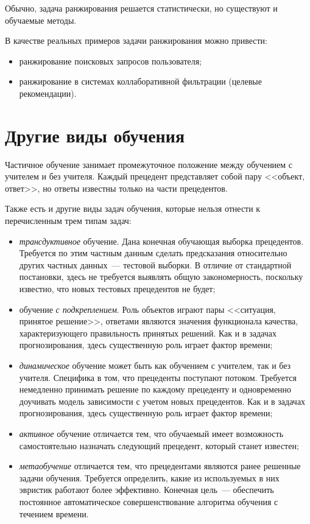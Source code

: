 \begin{itemize}
    Обычно, задача ранжирования решается статистически, но существуют и обучаемые методы.
    
    В качестве реальных примеров задачи ранжирования можно привести:
    \begin{itemize}
      \item ранжирование поисковых запросов пользователя;
      \item ранжирование в системах коллаборативной фильтрации (целевые рекомендации).
    \end{itemize}
\end{itemize}

\section{Другие виды обучения}
Частичное обучение занимает промежуточное положение между обучением с учителем и без учителя. Каждый
прецедент представляет собой пару <<объект, ответ>>, но ответы известны только на части прецедентов.

Также есть и другие виды задач обучения, которые нельзя отнести к перечисленным трем типам задач:
\begin{itemize}
  \vspace*{-1ex}
  \itemsep -5pt
  \item \emph{трансдуктивное} обучение. Дана конечная обучающая выборка прецедентов. Требуется по этим
    частным данным сделать предсказания относительно других частных данных~--- тестовой выборки. В
    отличие от стандартной постановки, здесь не требуется выявлять общую закономерность, поскольку
    известно, что новых тестовых прецедентов не будет;
  \item обучение \emph{с подкреплением}. Роль объектов играют пары <<ситуация, принятое решение>>,
    ответами являются значения функционала качества, характеризующего правильность принятых решений.
    Как и в задачах прогнозирования, здесь существенную роль играет фактор времени;
  \item \emph{динамическое} обучение может быть как обучением с учителем, так и без учителя. Специфика
    в том, что прецеденты поступают потоком. Требуется немедленно принимать решение по каждому
    прецеденту и одновременно доучивать модель зависимости с учетом новых прецедентов. Как и в задачах
    прогнозирования, здесь существенную роль играет фактор времени;
  \item \emph{активное} обучение отличается тем, что обучаемый имеет возможность самостоятельно
    назначать следующий прецедент, который станет известен;
  \item \emph{метаобучение} отличается тем, что прецедентами являются ранее решенные задачи обучения.
    Требуется определить, какие из используемых в них эвристик работают более эффективно. Конечная
    цель~--- обеспечить постоянное автоматическое совершенствование алгоритма обучения с течением
    времени.
\end{itemize}

